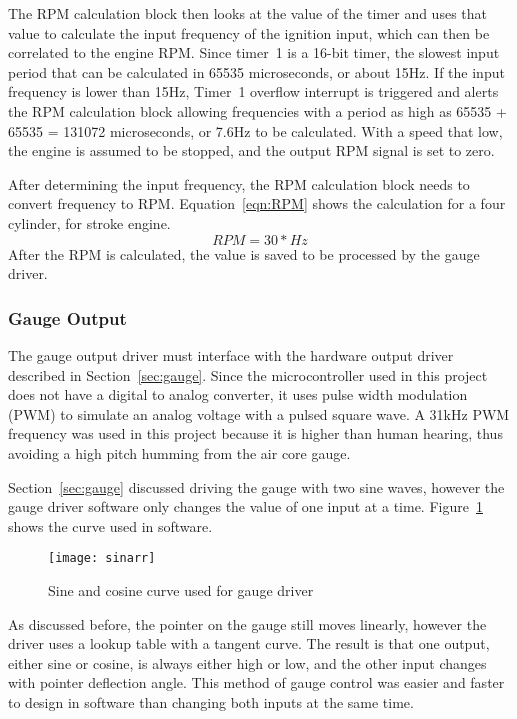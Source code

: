 The RPM calculation block then looks at the value of the timer and uses that value to calculate the input frequency of the ignition input, which can then be correlated to the engine RPM. Since timer~1 is a 16-bit timer, the slowest input period that can be calculated in 65535 microseconds, or about 15Hz. If the input frequency is lower than 15Hz, Timer~1 overflow interrupt is triggered and alerts the RPM calculation block allowing frequencies with a period as high as 65535 + 65535 = 131072 microseconds, or 7.6Hz to be calculated. With a speed that low, the engine is assumed to be stopped, and the output RPM signal is set to zero.

After determining the input frequency, the RPM calculation block needs to convert frequency to RPM. Equation~\ref{eqn:RPM} shows the calculation for a four cylinder, for stroke engine.
\begin{equation}
    \label{eqn:RPM}
    RPM = 30*Hz
\end{equation}
After the RPM is calculated, the value is saved to be processed by the gauge driver.

\subsubsection{Gauge Output} %
The gauge output driver must interface with the hardware output driver described in Section~\ref{sec:gauge}. Since the microcontroller used in this project does not have a digital to analog converter, it uses pulse width modulation (PWM) to simulate an analog voltage with a pulsed square wave. A 31kHz PWM frequency was used in this project because it is higher than human hearing, thus avoiding a high pitch humming from the air core gauge.

Section~\ref{sec:gauge} discussed driving the gauge with two sine waves, however the gauge driver software only changes the value of one input at a time. Figure~\ref{fig:scPWM} shows the curve used in software.

\begin{figure}[H]
    \centering
    \texttt{[image: sinarr]}
    \caption{Sine and cosine curve used for gauge driver}
    \label{fig:scPWM}
\end{figure}

As discussed before, the pointer on the gauge still moves linearly, however the driver uses a lookup table with a tangent curve. The result is that one output, either sine or cosine, is always either high or low, and the other input changes with pointer deflection angle. This method of gauge control was easier and faster to design in software than changing both inputs at the same time.

